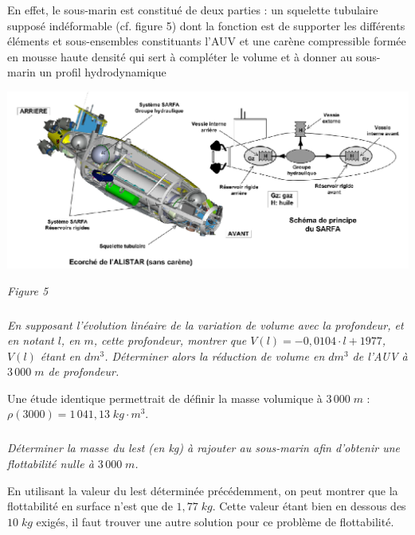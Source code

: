 \documentclass[11pt,oneside]{article}
\begin{document}
{En effet, le sous-marin est constitué de deux parties : un squelette tubulaire supposé indéformable (cf. figure 5) dont la fonction est de supporter les différents éléments et sous-ensembles constituants l’AUV et une carène compressible formée en mousse haute densité qui sert à compléter le volume et à donner au sous-marin un profil hydrodynamique

\begin{center}
\includegraphics[width=.95\textwidth]{png/fig_10}

\textit{Figure 5}
\end{center}

}
\subparagraph{}
\textit{En supposant l'évolution linéaire de la variation de volume avec la profondeur, et en notant $l$, en $m$, cette profondeur, montrer que $V(l)=-0,0104\cdot l + 1977$, $V(l)$ étant en $dm^3$. Déterminer alors la réduction de volume en $dm^3$ de l’AUV à $3\,000\;m$ de profondeur. }


Une étude identique permettrait de définir la masse volumique à $3\,000\;m$ : $\rho(3000)=1\, 041,13 \; kg\cdot m^3$.


\subparagraph{}
\textit{Déterminer la masse du lest (en kg) à rajouter au sous-marin afin d’obtenir une flottabilité nulle à $3\,000\;m$.}


En utilisant la valeur du lest déterminée précédemment, on peut montrer que la flottabilité en surface n'est que de $1,77\;kg$. Cette valeur étant bien en dessous des $10\;kg$ exigés, il faut trouver une autre solution pour ce problème de flottabilité.
\end{document}
